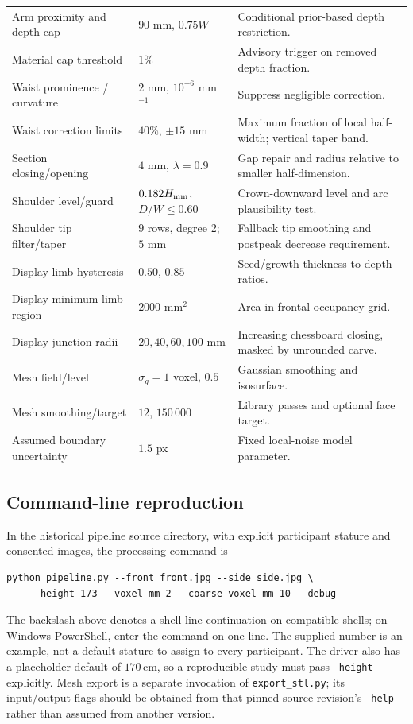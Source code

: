 \begin{longtable}{p{4.7cm}p{3.1cm}p{6.9cm}}
Arm proximity and depth cap & $90$ mm, $0.75W$ & Conditional prior-based depth restriction. \\
Material cap threshold & $1\%$ & Advisory trigger on removed depth fraction. \\
Waist prominence / curvature & $2$ mm, $10^{-6}$ mm$^{-1}$ & Suppress negligible correction. \\
Waist correction limits & $40\%$, $\pm15$ mm & Maximum fraction of local half-width; vertical taper band. \\
Section closing/opening & $4$ mm, $\lambda=0.9$ & Gap repair and radius relative to smaller half-dimension. \\
Shoulder level/guard & $0.182H_{\rm mm}$, $D/W\le0.60$ & Crown-downward level and arc plausibility test. \\
Shoulder tip filter/taper & $9$ rows, degree 2; $5$ mm & Fallback tip smoothing and postpeak decrease requirement. \\
Display limb hysteresis & $0.50$, $0.85$ & Seed/growth thickness-to-depth ratios. \\
Display minimum limb region & $2000$ mm$^2$ & Area in frontal occupancy grid. \\
Display junction radii & $20,40,60,100$ mm & Increasing chessboard closing, masked by unrounded carve. \\
Mesh field/level & $\sigma_g=1$ voxel, $0.5$ & Gaussian smoothing and isosurface. \\
Mesh smoothing/target & $12$, $150\,000$ & Library passes and optional face target. \\
Assumed boundary uncertainty & $1.5$ px & Fixed local-noise model parameter. \\
\end{longtable}

\subsection{Command-line reproduction}
In the historical pipeline source directory, with explicit participant stature and consented images, the processing command is
\begin{verbatim}
python pipeline.py --front front.jpg --side side.jpg \
    --height 173 --voxel-mm 2 --coarse-voxel-mm 10 --debug
\end{verbatim}
The backslash above denotes a shell line continuation on compatible shells; on Windows PowerShell, enter the command on one line. The supplied number is an example, not a default stature to assign to every participant. The driver also has a placeholder default of $170$\,cm, so a reproducible study must pass \texttt{--height} explicitly. Mesh export is a separate invocation of \texttt{export\_stl.py}; its input/output flags should be obtained from that pinned source revision's \texttt{--help} rather than assumed from another version.

